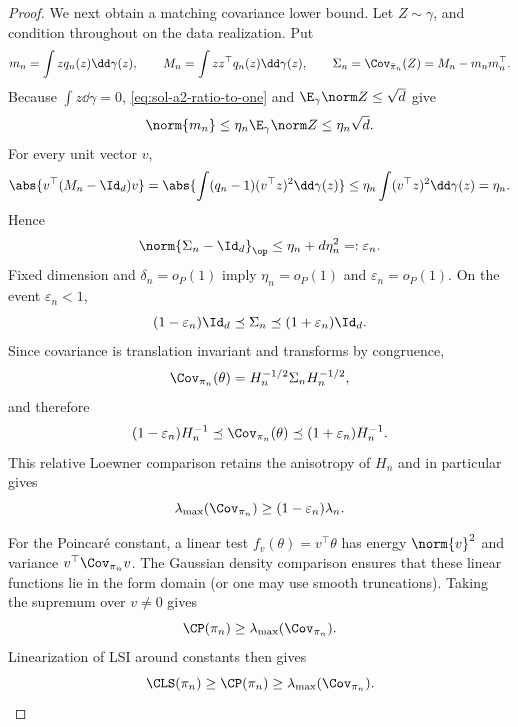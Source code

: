 \documentclass[../main.tex]{subfiles}
\begin{document}
\begin{proof}
We next obtain a matching covariance lower bound.  Let $Z\sim\gamma$, and condition throughout
on the data realization.  Put
\[
 m_n=\int zq_n(z)\dd\gamma(z),\qquad
 M_n=\int zz^\top q_n(z)\dd\gamma(z),\qquad
 \Sigma_n=\Cov_{\bar\pi_n}(Z)=M_n-m_nm_n^\top.
\]
Because $\int z\dd\gamma=0$, \eqref{eq:sol-a2-ratio-to-one} and
$\E_\gamma\norm Z\le\sqrt d$ give
\begin{equation}
\label{eq:sol-a2-mean-bound}
 \norm{m_n}
 \le\eta_n\E_\gamma\norm Z
 \le\eta_n\sqrt d.
\end{equation}
For every unit vector $v$,
\[
 \abs{v^\top(M_n-\Id_d)v}
 =\abs{\int(q_n-1)(v^\top z)^2\dd\gamma(z)}
 \le\eta_n\int(v^\top z)^2\dd\gamma(z)=\eta_n.
\]
Hence
\begin{equation}
\label{eq:sol-a2-covariance-bound}
 \norm{\Sigma_n-\Id_d}_{\op}
 \le \eta_n+d\eta_n^2=:\varepsilon_n.
\end{equation}
Fixed dimension and $\delta_n=o_P(1)$ imply
$\eta_n=o_P(1)$ and $\varepsilon_n=o_P(1)$.  On the event $\varepsilon_n<1$,
\[
 (1-\varepsilon_n)\Id_d\preceq\Sigma_n
 \preceq(1+\varepsilon_n)\Id_d.
\]
Since covariance is translation invariant and transforms by congruence,
\[
 \Cov_{\pi_n}(\theta)
 =H_n^{-1/2}\Sigma_nH_n^{-1/2},
\]
and therefore
\begin{equation}
\label{eq:sol-a2-unwhitened-covariance}
 (1-\varepsilon_n)H_n^{-1}
 \preceq\Cov_{\pi_n}(\theta)
 \preceq(1+\varepsilon_n)H_n^{-1}.
\end{equation}
This relative Loewner comparison retains the anisotropy of $H_n$ and in particular gives
\begin{equation}
\label{eq:sol-a2-covariance-top}
 \lambda_{\max}(\Cov_{\pi_n})
 \ge(1-\varepsilon_n)\lambda_n.
\end{equation}

For the Poincar\'e constant, a linear test
$f_v(\theta)=v^\top\theta$ has energy $\norm{v}^2$ and variance
$v^\top\Cov_{\pi_n}v$.  The Gaussian density comparison ensures that these linear functions lie
in the form domain (or one may use smooth truncations).  Taking the supremum over $v\ne0$ gives
\[
 \CP(\pi_n)\ge\lambda_{\max}(\Cov_{\pi_n}).
\]
Linearization of LSI around constants then gives
\[
 \CLS(\pi_n)\ge\CP(\pi_n)\ge\lambda_{\max}(\Cov_{\pi_n}).
\]


\end{proof}
\end{document}
